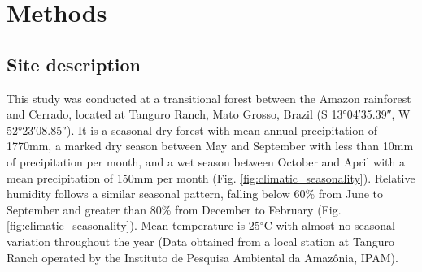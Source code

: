 \documentclass{article}
\begin{document}
\section{Methods}

\subsection{Site description}

This study was conducted at a transitional forest between the Amazon rainforest and Cerrado, located at Tanguro Ranch, Mato Grosso, Brazil (S \ang{13;04;35.39}, W \ang{52;23;08.85}). It is a seasonal dry forest with mean annual precipitation of 1770mm, a marked dry season between May and September with less than 10mm of precipitation per month, and a wet season between October and April with a mean precipitation of 150mm per month (Fig. \ref{fig:climatic_seasonality}). Relative humidity follows a similar seasonal pattern, falling below 60\% from June to September and greater than 80\% from December to February (Fig. \ref{fig:climatic_seasonality}).  Mean temperature is 25$^{\circ}$C with almost no seasonal variation throughout the year (Data obtained from a local station at Tanguro Ranch operated by the Instituto de Pesquisa Ambiental da Amazônia, IPAM). 
\end{document}
